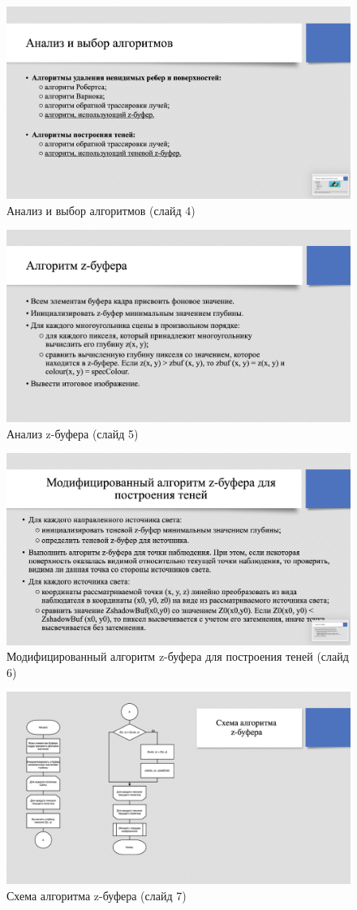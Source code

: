 \begin{figure}[h]
    \centering
    \includegraphics[width=0.5\linewidth]{img/anal.png}
    \caption{Анализ и выбор алгоритмов (слайд 4)}
    \label{img:anal}
\end{figure}
\noindent

\begin{figure}[h]
    \centering
    \includegraphics[width=0.5\linewidth]{img/z-buf.png}
    \caption{Анализ z-буфера (слайд 5)}
    \label{img:buf}
\end{figure}
\noindent

\begin{figure}[h]
    \centering
    \includegraphics[width=0.5\linewidth]{img/modif.png}
    \caption{Модифицированный алгоритм z-буфера для построения теней (слайд 6)}
    \label{img:modif}
\end{figure}
\noindent

\begin{figure}[h]
    \centering
    \includegraphics[width=0.5\linewidth]{img/Z.png}
    \caption{Схема алгоритма z-буфера (слайд 7)}
    \label{img:z}
\end{figure}
\noindent

